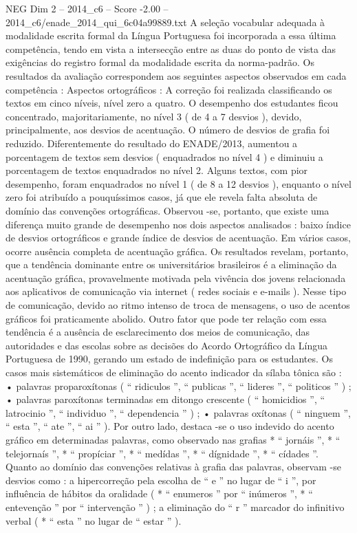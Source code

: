 \begin{textsample}{NEG Dim 2 – 2014\_c6 – Score -2.00 – 2014\_c6/enade\_2014\_qui\_6c04a99889.txt}
A seleção vocabular adequada à modalidade escrita formal da Língua Portuguesa foi incorporada a essa última competência, tendo em vista a intersecção entre as duas do ponto de vista das exigências do registro formal da modalidade escrita da norma-padrão.
Os resultados da avaliação correspondem aos seguintes aspectos observados em cada competência : Aspectos ortográficos : A correção foi realizada classificando os textos em cinco níveis, nível zero a quatro.
O desempenho dos estudantes ficou concentrado, majoritariamente, no nível 3 ( de 4 a 7 desvios ), devido, principalmente, aos desvios de acentuação.
O número de desvios de grafia foi reduzido.
Diferentemente do resultado do ENADE/2013, aumentou a porcentagem de textos sem desvios ( enquadrados no nível 4 ) e diminuiu a porcentagem de textos enquadrados no nível 2.
Alguns textos, com pior desempenho, foram enquadrados no nível 1 ( de 8 a 12 desvios ), enquanto o nível zero foi atribuído a pouquíssimos casos, já que ele revela falta absoluta de domínio das convenções ortográficas.
Observou -se, portanto, que existe uma diferença muito grande de desempenho nos dois aspectos analisados : baixo índice de desvios ortográficos e grande índice de desvios de acentuação.
Em vários casos, ocorre ausência completa de acentuação gráfica.
Os resultados revelam, portanto, que a tendência dominante entre os universitários brasileiros é a eliminação da acentuação gráfica, provavelmente motivada pela vivência dos jovens relacionada aos aplicativos de comunicação via internet ( redes sociais e e-mails ).
Nesse tipo de comunicação, devido ao ritmo intenso de troca de mensagens, o uso de acentos gráficos foi praticamente abolido.
Outro fator que pode ter relação com essa tendência é a ausência de esclarecimento dos meios de comunicação, das autoridades e das escolas sobre as decisões do Acordo Ortográfico da Língua Portuguesa de 1990, gerando um estado de indefinição para os estudantes.
Os casos mais sistemáticos de eliminação do acento indicador da sílaba tônica são : • palavras proparoxítonas ( “ ridiculos ”, “ publicas ”, “ lideres ”, “ politicos ” ) ; • palavras paroxítonas terminadas em ditongo crescente ( “ homicidios ”, “ latrocinio ”, “ individuo ”, “ dependencia ” ) ; • palavras oxítonas ( “ ninguem ”, “ esta ”, “ ate ”, “ ai ” ).
Por outro lado, destaca -se o uso indevido do acento gráfico em determinadas palavras, como observado nas grafias * “ jornáis ”, * “ telejornaís ”, * “ propíciar ”, * “ medídas ”, * “ dígnidade ”, * “ cídades ”.
Quanto ao domínio das convenções relativas à grafia das palavras, observam -se desvios como : a hipercorreção pela escolha de “ e ” no lugar de “ i ”, por influência de hábitos da oralidade ( * “ enumeros ” por “ inúmeros ”, * “ entevenção ” por “ intervenção ” ) ; a eliminação do “ r ” marcador do infinitivo verbal ( * “ esta ” no lugar de “ estar ” ).

\end{textsample}
